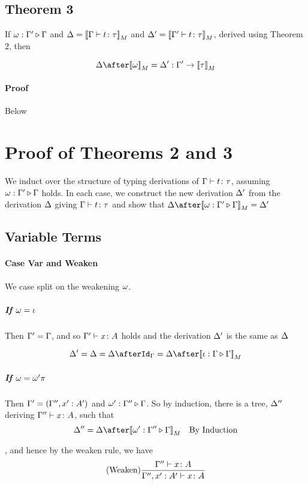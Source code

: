 \documentclass{report}
\begin{document}
\subsection{Theorem 3}

If $\omega : \Gamma' \triangleright \Gamma$ and $\Delta = {\bf [\![}\Gamma \vdash t \colon \tau{\bf ]\!]}_M$ and $\Delta' = {\bf [\![}\Gamma' \vdash t \colon \tau{\bf ]\!]}_M$, derived using Theorem 2, then 

$$
    \D \after \deno{\w} = \D' : \G' \rightarrow \deno{\tau}
$$
\paragraph{Proof} Below

\section{Proof of Theorems 2 and 3}
We induct over the structure of typing derivations of $\Gamma \vdash t \colon \tau$, assuming $\omega : \Gamma' \triangleright \Gamma$ holds. In each case, we construct the new derivation $\Delta'$ from the derivation $\Delta$ giving $\Gamma \vdash t \colon \tau$ and show that $\D\after\deno{\wrel{\w}{\G'}{\G}} = \D'$

\subsection{Variable Terms}
\paragraph{Case Var and Weaken}
    We case split on the weakening $\omega$.
    \subparagraph{If $\omega = \iota$}
    Then $\Gamma' = \Gamma$, and so $\Gamma' \vdash x \colon A$ holds and the derivation $\Delta'$ is the same as $\Delta$

    \begin{equation}
        \D' = \D = \D\after\idg = \D\after\deno{\wrel{\i}{\G}{\G}} 
    \end{equation}
    \subparagraph{If $\omega = \omega'\pi$}
    Then  $\Gamma' = (\Gamma'',x': A')$ and $\omega' : \Gamma'' \triangleright \Gamma$. So by induction, there is a tree, $\Delta''$ deriving $\Gamma'' \vdash x \colon A$,  such that 
    \begin{equation}
        \D'' = \D\after\deno{\wrel{\w'}{\G''}{\G}} \qt{By Induction}
    \end{equation}
    
    , and hence by the weaken rule, we have 
    \begin{equation}
        (\text{Weaken}) \frac{\Gamma'' \vdash x \colon A}{\Gamma'', x':A'  \vdash x \colon A}
    \end{equation}
\end{document}
